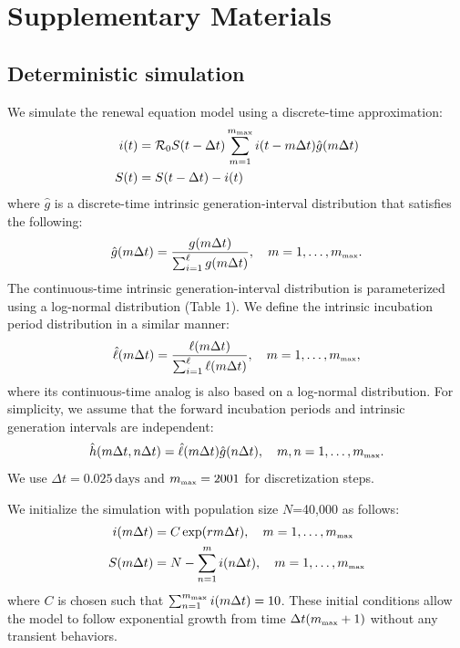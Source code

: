 \documentclass[12pt]{article}
\newcommand{\Rx}[1]{\ensuremath{{\mathcal R}_{#1}}\xspace}
\newcommand{\Ro}{\Rx{0}}
\newcommand{\tsub}[2]{#1_{{\textrm{\tiny #2}}}}
\newcommand{\gdist}{g} %
\newcommand{\idist}{\ell} %
\begin{document}
\pagebreak

\section{Supplementary Materials}

\subsection{Deterministic simulation}

We simulate the renewal equation model using a discrete-time approximation:
\begin{align}
i(t) &= \Ro S(t-\Delta t) \sum_{m=1}^{\tsub{m}{max}} i(t-m \Delta t) \hat{\gdist}(m \Delta t) \nonumber \\
S(t) &= S(t-\Delta t) - i(t)
\end{align}
where $\hat{\gdist}$ is a discrete-time intrinsic generation-interval distribution that satisfies the following:
\begin{equation}
\hat{\gdist}(m \Delta t) = \frac{\gdist(m \Delta t)}{\sum_{i=1}^\ell \gdist(m \Delta t)}, \quad m=1, \dots, \tsub{m}{max}.
\end{equation}
The continuous-time intrinsic generation-interval distribution is parameterized using a log-normal distribution (Table 1). We define the intrinsic incubation period distribution in a similar manner:
\begin{equation}
\hat{\idist}(m \Delta t) = \frac{\idist(m \Delta t)}{\sum_{i=1}^\ell \idist(m \Delta t)}, \quad m=1, \dots, \tsub{m}{max},
\end{equation}
where its continuous-time analog is also based on a log-normal distribution.
For simplicity, we assume that the forward incubation periods and intrinsic generation intervals are independent:
\begin{equation}
\hat{h}(m \Delta t, n \Delta t) = \hat{\idist}(m \Delta t)\hat{\gdist}(n \Delta t), \quad m,n=1, \dots, \tsub{m}{max}.
\end{equation}
We use $\Delta t = 0.025\,\textrm{days}$ and $\tsub{m}{max}=2001$ for discretization steps.

We initialize the simulation with population size $N$=40,000 as follows:
\begin{align}
i(m \Delta t) &= C \exp(r m \Delta t), \quad m=1, \dots, \tsub{m}{max}\nonumber \\
S(m \Delta t) &= N - \sum_{n=1}^m i(n \Delta t), \quad m=1, \dots, \tsub{m}{max}
\end{align}
where $C$ is chosen such that $\sum_{n=1}^{\tsub{m}{max}} i(m \Delta t)=10$.
These initial conditions allow the model to follow exponential growth from time $\Delta t (\tsub{m}{max} + 1)$ without any transient behaviors.
\end{document}
